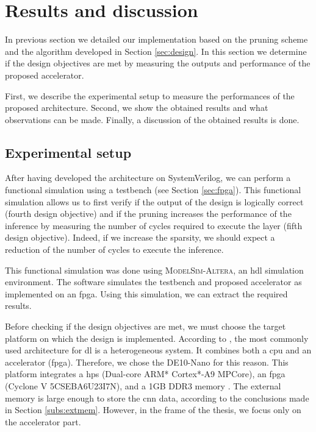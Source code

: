 \section{Results and discussion} \label{sec:measure}
In previous section we detailed our implementation based on the pruning scheme and the algorithm developed in Section \ref{sec:design}. In this section we determine if the design objectives are met by measuring the outputs and performance of the proposed accelerator.

First, we describe the experimental setup to measure the performances of the proposed architecture. Second, we show the obtained results and what observations can be made. Finally, a discussion of the obtained results is done.
%
\subsection{Experimental setup} \label{subs:exp_set}
%
After having developed the architecture on SystemVerilog, we can perform a functional simulation using a testbench (see Section \ref{sec:fpga}). This functional simulation allows us to first verify if the output of the design is logically correct (fourth design objective) and if the pruning increases the performance of the inference by measuring the number of cycles required to execute the layer (fifth design objective). Indeed, if we increase the sparsity, we should expect a reduction of the number of cycles to execute the inference.

This functional simulation was done using \textsc{ModelSim-Altera}, an \acrshort{hdl} simulation environment. The software simulates the testbench and proposed accelerator as implemented on an \acrshort{fpga}. Using this simulation, we can extract the required results.

Before checking if the design objectives are met, we must choose the target platform on which the design is implemented. According to \textcite{liu_fpga-based_2019}, the most commonly used architecture for \acrshort{dl} is a heterogeneous system. It combines both a \acrshort{cpu} and an accelerator (\acrshort{fpga}). Therefore, we chose the DE10-Nano for this reason. This platform integrates a \acrfull{hps} (Dual-core ARM* Cortex*-A9 MPCore), an \acrshort{fpga} (Cyclone V 5CSEBA6U23I7N), and a 1GB DDR3 memory \cite{technologies_terasic_nodate}. The external memory is large enough to store the \acrshort{cnn} data, according to the conclusions made in Section \ref{subs:extmem}. However, in the frame of the thesis, we focus only on the accelerator part.

